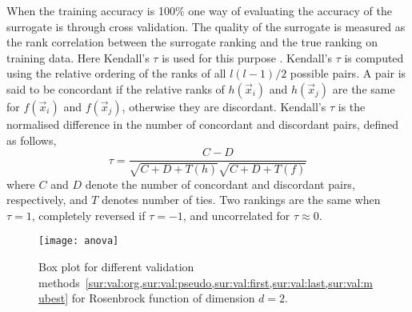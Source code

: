 When the training accuracy is 100\% one way of evaluating the accuracy of the surrogate is through cross validation. The quality of the surrogate is measured as the rank correlation between the surrogate ranking and the true ranking on training data. Here Kendall's $\tau$ is used for this purpose \citep[cf.][]{Kendall38}.  Kendall's $\tau$ is computed using the relative ordering of the ranks of all $l(l-1)/2$ possible pairs.  A pair is said to be concordant if the relative ranks of $h(\vec{x}_i)$ and $h(\vec{x}_j)$ are the same for $f(\vec{x}_i)$ and $f(\vec{x}_j)$, otherwise they are discordant. Kendall's $\tau$ is the normalised difference in the number of concordant and discordant pairs, defined as follows, %
\begin{equation}\label{eq:tau}
	\tau = \frac{C-D}{\sqrt{C+D+T(h)}\sqrt{C+D+T(f)}}
\end{equation}
where $C$ and $D$ denote the number of concordant and discordant pairs, respectively, and $T$ denotes number of ties. %
Two rankings are the same when $\tau=1$, completely reversed if $\tau = -1$, and uncorrelated for $\tau \approx 0$.

\begin{figure}
	\texttt{[image: anova]}
	\caption[Box plot for different validation strategies]{Box plot for different validation methods~\cref{sur:val:org,sur:val:pseudo,sur:val:first,sur:val:last,sur:val:mubest} for Rosenbrock function of dimension $d=2$.}
	\label{fig:boxplot}
\end{figure}

